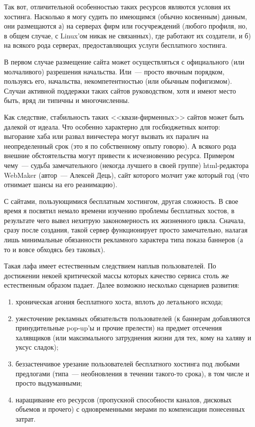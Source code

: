 Так вот, отличительной особенностью таких ресурсов являются условия их хостинга. Насколько я могу судить по имеющимся (обычно косвенным) данным, они размещаются а) на серверах фирм или госучреждений (любого профиля, но, в общем случае, с Linux'ом никак не связанных), где работают их создатели, и б) на всякого рода серверах, предоставляющих услуги бесплатного хостинга. 

В первом случае размещение сайта может осуществляться с официального (или молчаливого) разрешения начальства. Или~--- просто явочным порядком, пользуясь его, начальства, некомпетентностью (или обычным пофигизмом). Случаи активной поддержки таких сайтов руководством, хотя и имеют место быть, вряд ли типичны и многочисленны. 

Как следствие, стабильность таких <<квази-фирменных>> сайтов может быть далекой от идеала. Что особенно характерно для госбюджетных контор: выгорание хаба или развал винчестера могут вызвать их паралич на неопределенный срок (это я по собственному опыту говорю). А всякого рода внешние обстоятельства могут привести к исчезновению ресурса. Примером чему~--- судьба замечательного (некогда лучшего в своей группе) html-редактора WebMaker (автор~--- Алексей Дець), сайт которого молчит уже который год (что отнимает шансы на его реанимацию). 

С сайтами, пользующимися бесплатным хостингом, другая сложность. В свое время я посвятил немало времени изучению проблемы бесплатных хостов, в результате чего вывел нехитрую закономерность их жизненного цикла. Сначала, сразу после создания, такой сервер функционирует просто замечательно, налагая лишь минимальные обязанности рекламного характера типа показа баннеров (а то и вовсе обходясь без таковых). 

Такая лафа имеет естественным следствием наплыв пользователей. По достижении некоей критической массы которых качество сервиса столь же естественным образом падает. Далее возможно несколько сценариев развития: 

\begin{enumerate}
	\item хроническая агония бесплатного хоста, вплоть до летального исхода; 
	\item ужесточение рекламных обязательств пользователей (к баннерам добавляются принудительные pop-up'ы и прочие прелести) на предмет отсечения халявщиков (или максимального затруднения жизни для тех, кому на халяву и уксус сладок); 
	\item беззастенчивое урезание пользователей бесплатного хостинга под любыми предлогами (типа~--- необновления в течении такого-то срока), в том числе и просто выдуманными; 
	\item наращивание его ресурсов (пропускной способности каналов, дисковых объемов и прочего) с одновременными мерами по компенсации понесенных затрат. 
\end{enumerate}

